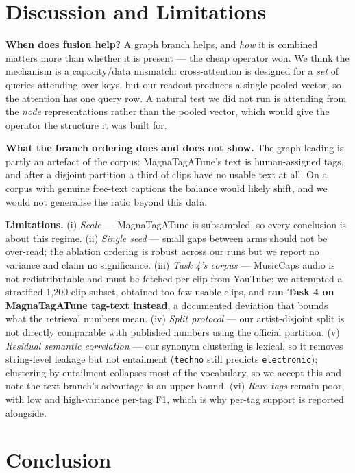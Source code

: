 \documentclass[10pt]{article}
\begin{document}
\vspace{-0.3em}
\section{Discussion and Limitations}

\textbf{When does fusion help?} A graph branch helps, and \emph{how} it is
combined matters more than whether it is present --- the cheap operator won. We
think the mechanism is a capacity/data mismatch: cross-attention is designed for
a \emph{set} of queries attending over keys, but our readout produces a single
pooled vector, so the attention has one query row. A natural test we did not run
is attending from the \emph{node} representations rather than the pooled vector,
which would give the operator the structure it was built for.

\textbf{What the branch ordering does and does not show.} The graph leading is
partly an artefact of the corpus: MagnaTagATune's text is human-assigned tags,
and after a disjoint partition a third of clips have no usable text at all. On a
corpus with genuine free-text captions the balance would likely shift, and we
would not generalise the ratio beyond this data.

\textbf{Limitations.}
(i) \emph{Scale} --- MagnaTagATune is subsampled, so every conclusion is about
this regime.
(ii) \emph{Single seed} --- small gaps between arms should not be over-read; the
ablation ordering is robust across our runs but we report no variance and claim
no significance.
(iii) \emph{Task 4's corpus} --- MusicCaps audio is not redistributable and must
be fetched per clip from YouTube; we attempted a stratified 1{,}200-clip subset,
obtained too few usable clips, and \textbf{ran Task 4 on MagnaTagATune tag-text
instead}, a documented deviation that bounds what the retrieval numbers mean.
(iv) \emph{Split protocol} --- our artist-disjoint split is not directly
comparable with published numbers using the official partition.
(v) \emph{Residual semantic correlation} --- our synonym clustering is lexical,
so it removes string-level leakage but not entailment (\texttt{techno} still
predicts \texttt{electronic}); clustering by entailment collapses most of the
vocabulary, so we accept this and note the text branch's advantage is an upper
bound.
(vi) \emph{Rare tags} remain poor, with low and high-variance per-tag F1, which
is why per-tag support is reported alongside.

\vspace{-0.3em}
\section{Conclusion}
\end{document}
